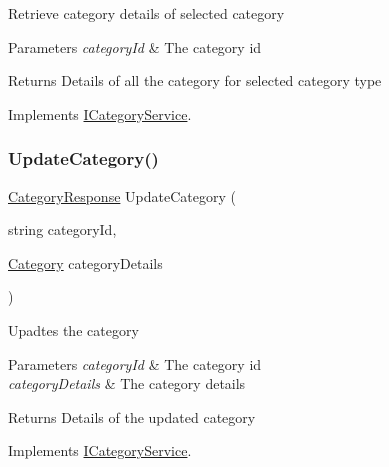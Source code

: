 Retrieve category details of selected category 


\begin{DoxyParams}{Parameters}
{\em category\+Id} & The category id\\
\hline
\end{DoxyParams}
\begin{DoxyReturn}{Returns}
Details of all the category for selected category type
\end{DoxyReturn}


Implements \hyperlink{interfaceWildLifeTracker_1_1ICategoryService_ac989af6747cc8b28f508ef7a4645d22f}{I\+Category\+Service}.

\mbox{\label{classWildLifeTracker_1_1CategoryService_adbaa7c66fd8789233e4d6f91ab3a4a2f}} 
\subsubsection{\texorpdfstring{Update\+Category()}{UpdateCategory()}}
{\footnotesize\ttfamily \hyperlink{classWildLifeTracker_1_1Response_1_1CategoryResponse}{Category\+Response} Update\+Category (\begin{DoxyParamCaption}\item[{string}]{category\+Id,  }\item[{\hyperlink{classWildLifeTracker_1_1Models_1_1Category}{Category}}]{category\+Details }\end{DoxyParamCaption})\hspace{0.3cm}{\ttfamily [inline]}}



Upadtes the category 


\begin{DoxyParams}{Parameters}
{\em category\+Id} & The category id\\
\hline
{\em category\+Details} & The category details\\
\hline
\end{DoxyParams}
\begin{DoxyReturn}{Returns}
Details of the updated category
\end{DoxyReturn}


Implements \hyperlink{interfaceWildLifeTracker_1_1ICategoryService_adbaa7c66fd8789233e4d6f91ab3a4a2f}{I\+Category\+Service}.



